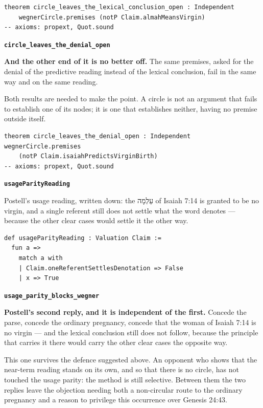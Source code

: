 \documentclass[11pt]{article}
\begin{document}
{\small\begin{verbatim}
theorem circle_leaves_the_lexical_conclusion_open : Independent
    wegnerCircle.premises (notP Claim.almahMeansVirgin)
-- axioms: propext, Quot.sound
\end{verbatim}}
\par\medskip\noindent\textbf{\texttt{circle\_\allowbreak{}leaves\_\allowbreak{}the\_\allowbreak{}denial\_\allowbreak{}open}}\par\nobreak\noindent
\textbf{And the other end of it is no better off.} The same premises, asked for the denial of the predictive reading instead of the lexical conclusion, fail in the same way and on the same reading.

Both results are needed to make the point. A circle is not an argument that fails to establish one of its nodes; it is one that establishes neither, having no premise outside itself.

{\small\begin{verbatim}
theorem circle_leaves_the_denial_open : Independent wegnerCircle.premises
    (notP Claim.isaiahPredictsVirginBirth)
-- axioms: propext, Quot.sound
\end{verbatim}}
\par\medskip\noindent\textbf{\texttt{usage\allowbreak{}Parity\allowbreak{}Reading}}\par\nobreak\noindent
Postell’s usage reading, written down: the עַלְמָה of Isaiah 7:14 is granted to be no virgin, and a single referent still does not settle what the word denotes — because the other clear cases would settle it the other way.

{\small\begin{verbatim}
def usageParityReading : Valuation Claim :=
  fun a =>
    match a with
    | Claim.oneReferentSettlesDenotation => False
    | x => True
\end{verbatim}}
\par\medskip\noindent\textbf{\texttt{usage\_\allowbreak{}parity\_\allowbreak{}blocks\_\allowbreak{}wegner}}\par\nobreak\noindent
\textbf{Postell’s second reply, and it is independent of the first.} Concede the parse, concede the ordinary pregnancy, concede that the woman of Isaiah 7:14 is no virgin — and the lexical conclusion still does not follow, because the principle that carries it there would carry the other clear cases the opposite way.

This one survives the defence suggested above. An opponent who shows that the near-term reading stands on its own, and so that there is no circle, has not touched the usage parity: the method is still selective. Between them the two replies leave the objection needing both a non-circular route to the ordinary pregnancy and a reason to privilege this occurrence over Genesis 24:43.
\end{document}
